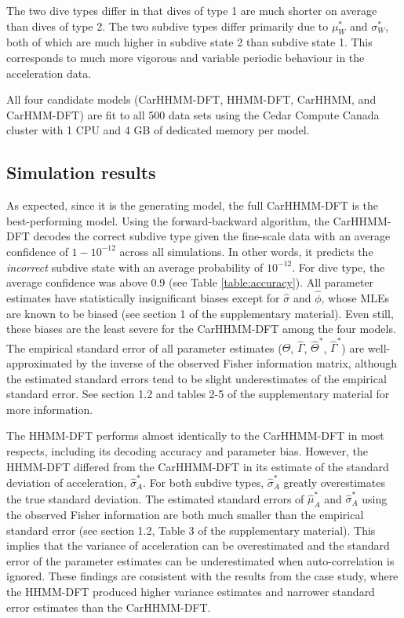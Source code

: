 The two dive types differ in that dives of type 1 are much shorter on average than dives of type 2. The two subdive types differ primarily due to $\mu_W^*$ and $\sigma_W^*$, both of which are much higher in subdive state 2 than subdive state 1. This corresponds to much more vigorous and variable periodic behaviour in the acceleration data.

All four candidate models (CarHHMM-DFT, HHMM-DFT, CarHHMM, and CarHMM-DFT) are fit to all 500 data sets using the Cedar Compute Canada cluster with 1 CPU and 4 GB of dedicated memory per model.

\subsection{Simulation results}

As expected, since it is the generating model, the full CarHHMM-DFT is the best-performing model. Using the forward-backward algorithm, the CarHHMM-DFT decodes the correct subdive type given the fine-scale data with an average confidence of $1 - 10^{-12}$ across all simulations. In other words, it predicts the \textit{incorrect} subdive state with an average probability of $10^{-12}$. For dive type, the average confidence was above 0.9 (see Table \ref{table:accuracy}). All parameter estimates have statistically insignificant biases except for $\hat \sigma$ and $\hat \phi$, whose MLEs are known to be biased (see section 1 of the supplementary material). Even still, these biases are the least severe for the CarHHMM-DFT among the four models. The empirical standard error of all parameter estimates ($\hat \Theta$, $\hat \Gamma$, $\hat \Theta^*$, $\hat \Gamma^*$) are well-approximated by the inverse of the observed Fisher information matrix, although the estimated standard errors tend to be slight underestimates of the empirical standard error. See section 1.2 and tables 2-5 of the supplementary material for more information.

The HHMM-DFT performs almost identically to the CarHHMM-DFT in most respects, including its decoding accuracy and parameter bias. However, the HHMM-DFT differed from the CarHHMM-DFT in its estimate of the standard deviation of acceleration, $\hat \sigma_A^*$. For both subdive types, $\hat \sigma_A^*$ greatly overestimates the true standard deviation. The estimated standard errors of $\hat \mu_A^*$ and $\hat \sigma_A^*$ using the observed Fisher information are both much smaller than the empirical standard error (see section 1.2, Table 3 of the supplementary material). This implies that the variance of acceleration can be overestimated and the standard error of the parameter estimates can be underestimated when auto-correlation is ignored. These findings are consistent with the results from the case study, where the HHMM-DFT produced higher variance estimates and narrower standard error estimates than the CarHHMM-DFT.

